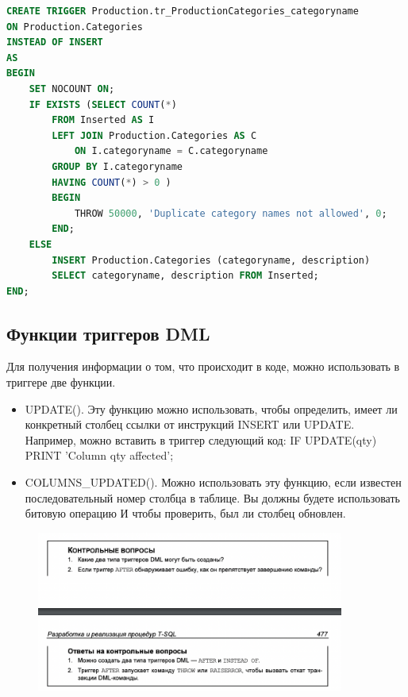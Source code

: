 \begin{lstlisting}[label=lst:funcReturn, language=sql]
CREATE TRIGGER Production.tr_ProductionCategories_categoryname
ON Production.Categories
INSTEAD OF INSERT
AS
BEGIN
	SET NOCOUNT ON;
	IF EXISTS (SELECT COUNT(*)
		FROM Inserted AS I
		LEFT JOIN Production.Categories AS C
			ON I.categoryname = C.categoryname
		GROUP BY I.categoryname
		HAVING COUNT(*) > 0 )
		BEGIN
			THROW 50000, 'Duplicate category names not allowed', 0;
		END;
	ELSE
		INSERT Production.Categories (categoryname, description)
		SELECT categoryname, description FROM Inserted;
END; 
\end{lstlisting}


\subsection{Функции триггеров DML}

Для получения информации о том, что происходит в коде, можно использовать
в триггере две функции. 
\begin{itemize}
	\item UPDATE(). Эту функцию можно использовать, чтобы определить, имеет ли конкретный столбец ссылки от инструкций INSERT или UPDATE. Например, можно
	вставить в триггер следующий код: IF UPDATE(qty) PRINT 'Column qty affected';
	\item COLUMNS\_UPDATED(). Можно использовать эту функцию, если известен последовательный номер столбца в таблице. Вы должны будете использовать битовую операцию  И чтобы проверить, был ли столбец обновлен. 
\end{itemize}


\begin{figure}[h!]
	\begin{center}
		\includegraphics[width=0.9\textwidth]{img/control39.png}
	\end{center}
	\captionsetup{justification=centering}
\end{figure}

